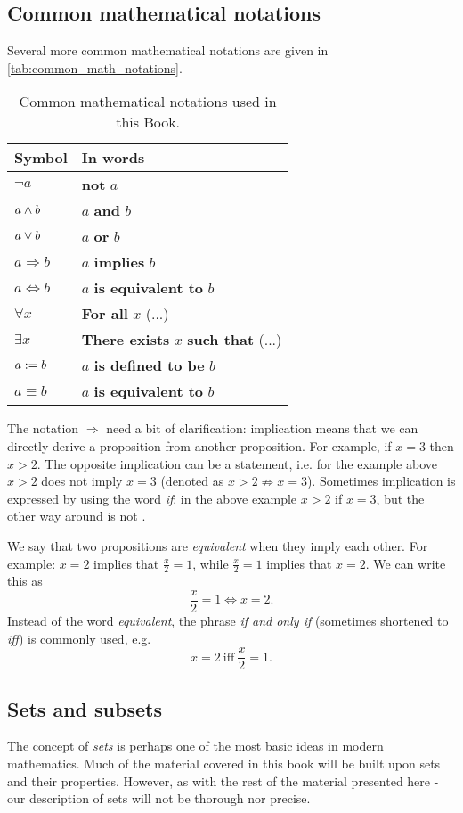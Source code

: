 \subsection{Common mathematical notations}

Several more common mathematical notations are given in \autoref{tab:common_math_notations}.
  
\begin{table}
	\centering
	\caption{Common mathematical notations used in this Book.}
	\label{tab:common_math_notations}
	\begin{tabular}{ll}
		\toprule
		Symbol & In words\\
		\midrule
		$\neg a$ & \textbf{not} $a$\\
		$a \wedge b$ & $a$ \textbf{and} $b$\\
		$a \vee b$ & $a$ \textbf{or} $b$\\
		$a \Rightarrow b$ & $a$ \textbf{implies} $b$\\
		$a \Leftrightarrow b$ & $a$ \textbf{is equivalent to} $b$\\
		$\forall x$ & \textbf{For all} $x$ (...)\\
		$\exists x$ & \textbf{There exists} $x$ \textbf{such that} (...)\\
		$a:= b$ & $a$ \textbf{is defined to be} $b$\\
		$a\equiv b$ & $a$ \textbf{is equivalent to} $b$\\
		\midrule
	\end{tabular}
\end{table}

The notation $\Rightarrow$ need a bit of clarification: implication means that we can directly derive a proposition from another proposition. For example, if $x=3$ then $x>2$. The opposite implication can be a \false{} statement, i.e. for the example above $x>2$ does not imply $x=3$ (denoted as $x>2 \nRightarrow x=3$). Sometimes implication is expressed by using the word \textit{if}: in the above example $x>2$ if $x=3$, but the other way around is not \true{}.

We say that two propositions are \emph{equivalent} when they imply each other. For example: $x=2$ implies that $\frac{x}{2}=1$, while $\frac{x}{2}=1$ implies that $x=2$. We can write this as
\[
	\frac{x}{2}=1 \Leftrightarrow x=2.
\]
Instead of the word \textit{equivalent}, the phrase \textit{if and only if} (sometimes shortened to \emph{iff}) is commonly used, e.g.
\[
	x=2\ \text{iff}\ \frac{x}{2}=1.
\]

\subsection{Sets and subsets}
The concept of \emph{sets} is perhaps one of the most basic ideas in modern mathematics. Much of the material covered in this book will be built upon sets and their properties. However, as with the rest of the material presented here - our description of sets will not be thorough nor precise.

